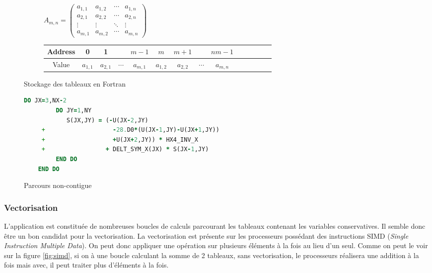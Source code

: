 \begin{figure}[ht]
  \centering
  \begin{subfigure}[b]{1\textwidth}
    \centering
    $A_{m,n} = 
    \begin{pmatrix}
      a_{1,1} & a_{1,2} & \cdots & a_{1,n} \\
      a_{2,1} & a_{2,2} & \cdots & a_{2,n} \\
      \vdots  & \vdots  & \ddots & \vdots  \\
      a_{m,1} & a_{m,2} & \cdots & a_{m,n} 
    \end{pmatrix}
    $
  \end{subfigure}
  \vspace{0.6cm}
  
  \begin{subfigure}[b]{1\textwidth}
    \centering
    \begin{tabular}{|c|c|c|c|c|c|c|c|c|c|c|c|c|c|}
      \hline
      Address & 0 & 1  & & $m-1$ & $m$ & $m+1$ &  & $nm-1$ \\
      \hline
      Value & $a_{1,1}$ & $a_{2,1}$ & $\cdots$ & $a_{m,1}$ & $a_{1,2}$ & $a_{2,2}$ & $\cdots$ & $a_{m,n}$ \\
      \hline
      \end{tabular}
  \end{subfigure}
  \caption{\label{fig:rowmajor}Stockage des tableaux en Fortran}
\end{figure}

\begin{figure}[h]
  \centering
  \begin{lstlisting}[language=Fortran]
    DO JX=3,NX-2
         DO JY=1,NY
            S(JX,JY) = (-U(JX-2,JY)
     +                   -28.D0*(U(JX-1,JY)-U(JX+1,JY))
     +                   +U(JX+2,JY)) * HX4_INV_X 
     +                 + DELT_SYM_X(JX) * S(JX-1,JY)
         END DO
    END DO
  \end{lstlisting}
  \caption{\label{fig:noncontiguous}Parcours non-contigue}
\end{figure}



\subsubsection{Vectorisation}
L'application est constituée de nombreuses boucles de calculs parcourant les tableaux contenant les variables conservatives. Il semble donc être un bon candidat pour la vectorisation. La vectorisation est présente sur les processeurs possédant des instructions SIMD (\textit{Single Instruction Multiple Data}). On peut donc appliquer une opération sur plusieurs éléments à la fois au lieu d'un seul. Comme on peut le voir sur la figure \ref{fig:simd}, si on à une boucle calculant la somme de 2 tableaux, sans vectorisation, le processeurs réalisera une addition à la fois mais avec, il peut traiter plus d'éléments à la fois.

